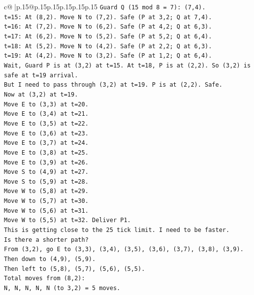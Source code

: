 \documentclass{article}
\begin{document}
{\begin{supertabular}{c@{$\;$}|p{.15\linewidth}@{}p{.15\linewidth}p{.15\linewidth}p{.15\linewidth}p{.15\linewidth}p{.15\linewidth}}
{{{\texttt{Guard Q (15 mod 8 = 7): (7,4).} \\
\texttt{t=15: At (8,2). Move N to (7,2). Safe (P at 3,2; Q at 7,4).} \\
\texttt{t=16: At (7,2). Move N to (6,2). Safe (P at 4,2; Q at 6,3).} \\
\texttt{t=17: At (6,2). Move N to (5,2). Safe (P at 5,2; Q at 6,4).} \\
\texttt{t=18: At (5,2). Move N to (4,2). Safe (P at 2,2; Q at 6,3).} \\
\texttt{t=19: At (4,2). Move N to (3,2). Safe (P at 1,2; Q at 6,4).} \\
\texttt{Wait, Guard P is at (3,2) at t=15. At t=18, P is at (2,2). So (3,2) is safe at t=19 arrival.} \\
\texttt{But I need to pass through (3,2) at t=19. P is at (2,2). Safe.} \\
\texttt{Now at (3,2) at t=19.} \\
\texttt{Move E to (3,3) at t=20.} \\
\texttt{Move E to (3,4) at t=21.} \\
\texttt{Move E to (3,5) at t=22.} \\
\texttt{Move E to (3,6) at t=23.} \\
\texttt{Move E to (3,7) at t=24.} \\
\texttt{Move E to (3,8) at t=25.} \\
\texttt{Move E to (3,9) at t=26.} \\
\texttt{Move S to (4,9) at t=27.} \\
\texttt{Move S to (5,9) at t=28.} \\
\texttt{Move W to (5,8) at t=29.} \\
\texttt{Move W to (5,7) at t=30.} \\
\texttt{Move W to (5,6) at t=31.} \\
\texttt{Move W to (5,5) at t=32. Deliver P1.} \\
\texttt{This is getting close to the 25 tick limit. I need to be faster.} \\
\texttt{Is there a shorter path?} \\
\texttt{From (3,2), go E to (3,3), (3,4), (3,5), (3,6), (3,7), (3,8), (3,9).} \\
\texttt{Then down to (4,9), (5,9).} \\
\texttt{Then left to (5,8), (5,7), (5,6), (5,5).} \\
\texttt{Total moves from (8,2):} \\
\texttt{N, N, N, N, N (to 3,2) = 5 moves.} \\
}}}
\end{supertabular}}
\end{document}
